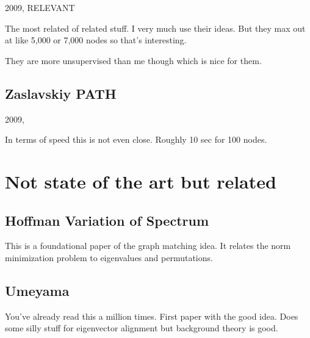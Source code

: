 \documentclass{article}[11pt]
\begin{document}
2009, RELEVANT

The most related of related stuff. I very much use their ideas. But they max out at like 5,000 or 7,000 nodes so that's interesting.

They are more unsupervised than me though which is nice for them.

\subsection{Zaslavskiy PATH \cite{4641936}}

2009,

In terms of speed this is not even close. Roughly 10 sec for 100 nodes.

\section{Not state of the art but related}

\subsection{Hoffman Variation of Spectrum \cite{Hoffman1953}}

This is a foundational paper of the graph matching idea. It relates the norm minimization problem to eigenvalues and permutations.

\subsection{Umeyama \cite{Umeyama1988}}

You've already read this a million times. First paper with the good idea. Does some silly stuff for eigenvector alignment but background theory is good.

 
\end{document}
